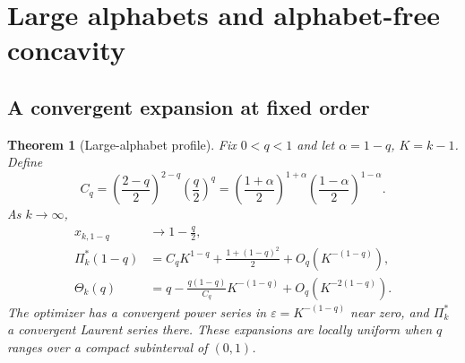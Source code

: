 \documentclass[11pt]{article}
\numberwithin{equation}{section}
\newtheorem{theorem}{Theorem}[section]
\theoremstyle{definition}
\theoremstyle{remark}
\begin{document}
\section{Large alphabets and alphabet-free concavity}\label{bep:ae:sec:large}
\subsection{A convergent expansion at fixed order}
\begin{theorem}[Large-alphabet profile]\label{bep:ae:thm:large}
Fix $0<q<1$ and let $\alpha=1-q$, $K=k-1$. Define
\begin{equation}\label{bep:ae:eq:C}
 C_q=\left(\frac{2-q}{2}\right)^{2-q}
     \left(\frac q2\right)^q
 =\left(\frac{1+\alpha}{2}\right)^{1+\alpha}
  \left(\frac{1-\alpha}{2}\right)^{1-\alpha}.
\end{equation}
As $k\to\infty$,
\begin{align}
 x_{k,1-q}&\longrightarrow1-\frac q2,\label{bep:ae:eq:xlimit}\\
 \Pi^{*}_k(1-q)&=C_qK^{1-q}+\frac{1+(1-q)^2}{2}
                         +O_q(K^{-(1-q)}),\label{bep:ae:eq:Rlarge}\\
 \Theta_k(q)&=q-\frac{q(1-q)}{C_q}K^{-(1-q)}
                         +O_q(K^{-2(1-q)}).\label{bep:ae:eq:thetalarge}
\end{align}
The optimizer has a convergent power series in $\varepsilon=K^{-(1-q)}$
near zero, and $\Pi^{*}_k$ a convergent Laurent series there. These expansions
are locally uniform when $q$ ranges over a compact subinterval of $(0,1)$.
\end{theorem}
\end{document}
